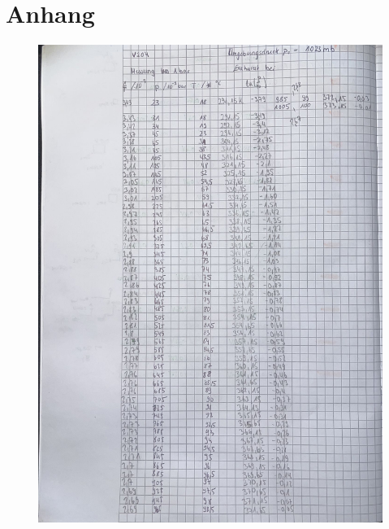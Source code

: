 \section{Anhang}

\begin{figure}
    \center
    \includegraphics[width=12.5cm]{bilder/Anhang1.jpeg}
\end{figure}

